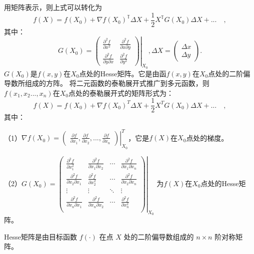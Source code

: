 用矩阵表示，则上式可以转化为
\begin{equation}
    f(X) = f(X_0) + \nabla f(X_0)^{\mathbb{T}}\Delta X + \frac{1}{2}X^{\mathbb{T}}G(X_0)\Delta X + ...\quad,
\end{equation}
其中：
\begin{equation}
    G(X_0) = 
        \left.
        \begin{pmatrix}
            \displaystyle\frac{\partial^2f}{\partial x^2} & \displaystyle\frac{\partial^2f}{\partial x\partial y} \\
            \displaystyle\frac{\partial^2f}{\partial y\partial x} & \displaystyle\frac{\partial^2f}{\partial y^2}
        \end{pmatrix}
        \right|_{X_0},
    \Delta X = 
        \begin{pmatrix}
                \Delta x \\
                \Delta y
        \end{pmatrix}.
\end{equation}
$G(X_0)$是$f(x,y)$在$X_0$点处的Hesse矩阵。它是由函$f(x,y)$在$X_0$点处的二阶偏导数所组成的方阵。
将二元函数的泰勒展开式推广到多元函数，则$f(x_1,x_2...,x_n)$在$X_0$点处的泰勒展开式的矩阵形式为：
\begin{equation}
    f(X) = f(X_0) + \nabla f(X_0)^T\Delta X + \frac{1}{2}X^TG(X_0)\Delta X + ...\quad,
\end{equation}
其中：

（1）$\nabla f(X_0) =
    \left.
    \begin{pmatrix}
        \displaystyle\frac{\partial f}{\partial x_1},
        \displaystyle\frac{\partial f}{\partial x_2},
        ...,
        \displaystyle\frac{\partial f}{\partial x_n} 
    \end{pmatrix}\right|_{X_0}^T$，它是$f(X)$在$X_0$点处的梯度。
        
（2）$ G(X_0) = 
        \left.
        \begin{pmatrix}
            \displaystyle\frac{\partial^2f}{\partial x_1^2} & \displaystyle\frac{\partial^2f}{\partial x_1\partial x_2} & \cdots & \displaystyle\frac{\partial^2f}{\partial x_1\partial x_n}\\
            \displaystyle\frac{\partial^2f}{\partial x_2\partial x_1} & \displaystyle\frac{\partial^2f}{\partial x_2^2} & \cdots & \displaystyle\frac{\partial^2f}{\partial x_2\partial x_n}\\
            \vdots & \vdots & \ddots & \vdots\\
            \displaystyle\frac{\partial^2f}{\partial x_n\partial x_1} & \displaystyle\frac{\partial^2f}{\partial x_n\partial x_2} & \cdots & \displaystyle\frac{\partial^2f}{\partial x_n^2}\\
        \end{pmatrix}
        \right|_{X_0}$
        为$f(X)$在$X_0$点处的Hesse矩阵。
\begin{definition}[Hesse矩阵]
    Hesse矩阵是由目标函数 $f(\cdot)$ 在点 $X$ 处的二阶偏导数组成的 $n\times n$ 阶对称矩阵。       
\end{definition}
    
